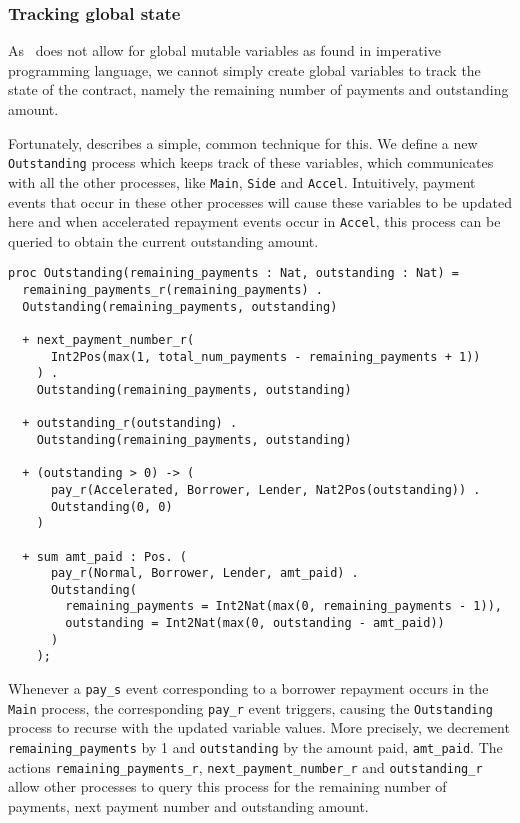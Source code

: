 \documentclass{article}
\begin{document}
\subsubsection{Tracking global state}

As \mcrl \, does not allow for global mutable variables as found in
imperative programming language, we cannot simply create global variables to
track the state of the contract, namely the remaining number of payments and
outstanding amount.

Fortunately, \cite[Section 3.2.2]{mcrl_lhc} describes a simple, common
technique for this.
We define a new \texttt{Outstanding} process which keeps track of these
variables, which communicates with all the other processes, like
\texttt{Main}, \texttt{Side} and \texttt{Accel}.
Intuitively, payment events that occur in these other processes will cause
these variables to be updated here and when accelerated repayment events
occur in \texttt{Accel}, this process can be queried to obtain the current
outstanding amount.

\begin{lstlisting}
proc Outstanding(remaining_payments : Nat, outstanding : Nat) =
  remaining_payments_r(remaining_payments) .
  Outstanding(remaining_payments, outstanding)

  + next_payment_number_r(
      Int2Pos(max(1, total_num_payments - remaining_payments + 1))
    ) .
    Outstanding(remaining_payments, outstanding)

  + outstanding_r(outstanding) .
    Outstanding(remaining_payments, outstanding)

  + (outstanding > 0) -> (
      pay_r(Accelerated, Borrower, Lender, Nat2Pos(outstanding)) .
      Outstanding(0, 0)
    )

  + sum amt_paid : Pos. (
      pay_r(Normal, Borrower, Lender, amt_paid) .
      Outstanding(
        remaining_payments = Int2Nat(max(0, remaining_payments - 1)),
        outstanding = Int2Nat(max(0, outstanding - amt_paid))
      )
    );
\end{lstlisting}

Whenever a \texttt{pay\_s} event corresponding to a borrower repayment occurs
in the \texttt{Main} process,
the corresponding \texttt{pay\_r} event triggers, causing the
\texttt{Outstanding} process to recurse with the updated variable values.
More precisely, we decrement \texttt{remaining\_payments} by 1 and
\texttt{outstanding} by the amount paid, \texttt{amt\_paid}.
The actions \texttt{remaining\_payments\_r}, \texttt{next\_payment\_number\_r}
and \texttt{outstanding\_r} allow other processes to query this process for
the remaining number of payments, next payment number and outstanding amount.
\end{document}
